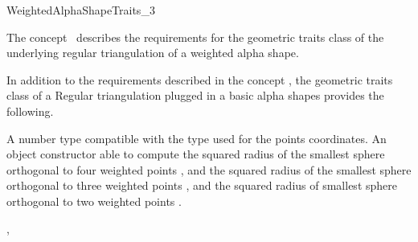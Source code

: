 

\begin{ccRefConcept}{WeightedAlphaShapeTraits_3}


\ccDefinition
  
The concept \ccRefName\ describes the requirements 
for the geometric traits class
of  the underlying  regular triangulation of a weighted alpha shape.

\ccGeneralizes
{}

In addition to the requirements described in the concept 
,
the geometric traits class of a
Regular triangulation plugged in a basic alpha shapes
provides the following.

\ccTypes


 {A number type compatible with the type used for
  the points coordinates.}
{An object constructor able to compute the squared radius of the
 smallest sphere  orthogonal to  four weighted points ,
and the squared radius of the
smallest sphere  orthogonal to  three  weighted points ,
and the squared radius of smallest  sphere orthogonal to 
two weighted points .} 

\ccCreation
{}  %


\ccAccessFunctions
{} {}


\ccHasModels

,

\end{ccRefConcept}


